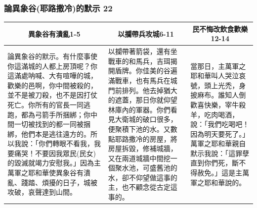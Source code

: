 \subsubsection{論異象谷(耶路撒冷)的默示 22}
\begin{table}[H]
\centering
\begin{tabular}{p{7.25cm}|p{5.75cm}|p{3.750cm}}\hline\hline
\multicolumn{1}{c|}{異象谷有潰亂1-5}&\multicolumn{1}{c|}{以攔帶兵攻城6-11}&\multicolumn{1}{c}{民不悔改飲食歡樂12-14}\\\hline
論異象谷的默示。有什麼事使你這滿城的人都上房頂呢？你這滿處呐喊、大有喧嘩的城，歡樂的邑啊，你中間被殺的，並不是被刀殺，也不是因打仗死亡。你所有的官長一同逃跑，都為弓箭手所捆綁；你中間一切被找到的都一同被捆綁，他們本是逃往遠方的。所以我說：「你們轉眼不看我，我要痛哭！不要因我眾民(民女)的毀滅就竭力安慰我。」因為主萬軍之耶和華使異象谷有潰亂、踐踏、煩擾的日子，城被攻破，哀聲達到山間。
&以攔帶著箭袋，還有坐戰車的和馬兵，吉珥揭開盾牌。你佳美的谷遍滿戰車，也有馬兵在城門前排列。他去掉猶大的遮蓋，那日你就仰望林庫內的軍器。你們看見大衛城的破口很多，便聚積下池的水。又數點耶路撒冷的房屋，將房屋拆毀，修補城牆，又在兩道城牆中間挖一個聚水池，可盛舊池的水，卻不仰望做這事的主，也不顧念從古定這事的。
&當那日，主萬軍之耶和華叫人哭泣哀號，頭上光禿，身披麻布。誰知人倒歡喜快樂，宰牛殺羊，吃肉喝酒，說：「我們吃喝吧！因為明天要死了。」萬軍之耶和華親自默示我說：「這罪孽直到你們死，斷不得赦免。」這是主萬軍之耶和華說的。\\\hline
\end{tabular}
\end{table}



